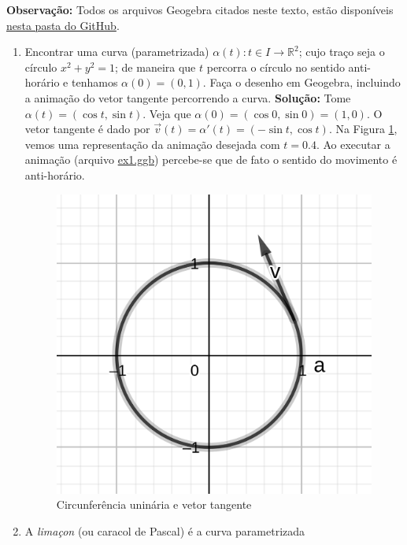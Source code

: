 \documentclass[12pt,letterpaper]{article}
\begin{document}
	
	\large{\textbf{Observação:}} Todos os arquivos Geogebra citados neste texto, estão disponíveis \href{https://github.com/reneroliveira/Curves_and_Surfaces/tree/main/ggb_files}{nesta pasta do GitHub}.
	\begin{enumerate}
		\item Encontrar uma curva (parametrizada) $\alpha(t) : t \in I \to \mathbb{R}^2$; cujo traço seja o círculo
		$x^2 + y^2 = 1$; de maneira que $t$ percorra o círculo no sentido anti-horário e tenhamos $\alpha (0) = (0, 1)$. Faça o desenho em Geogebra, incluindo a animação do vetor tangente percorrendo a curva.
		\subitem \textbf{Solução:} Tome $\alpha (t) = (\cos t,\sin t)$. Veja que $\alpha(0)=(\cos 0,\sin 0) = (1,0)$. O vetor tangente é dado por $\vec v(t)=\alpha '(t)=(-\sin t,\cos t)$. Na Figura \ref{ex1}, vemos uma representação da animação desejada com $t=0.4$. Ao executar a animação (arquivo \href{https://github.com/reneroliveira/Curves_and_Surfaces/tree/main/ggb_files}{ex1.ggb}) percebe-se que de fato o sentido do movimento é anti-horário.
		\begin{figure}[!htb]
			\centering
			\label{ex1}
			\includegraphics[scale=2]{../images/L1_ex1.png}
			\caption{Circunferência uninária e vetor tangente}
		\end{figure}
		
		\item A \emph{limaçon} (ou caracol de Pascal) é a curva parametrizada 
		

\end{enumerate}
\end{document}

